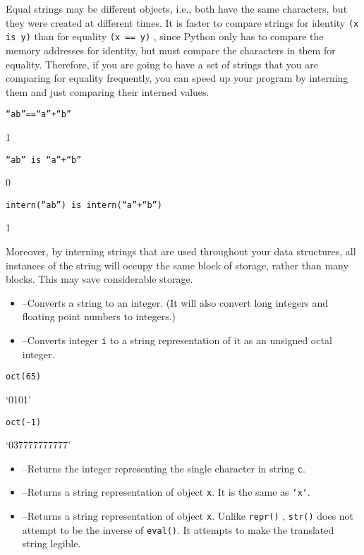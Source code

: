 Equal strings may be different
objects, i.e., both have the same characters, but they were created at
different times. It is faster to compare strings for identity \texttt{(x
is y)} than for equality \texttt{(x == y)} , since Python only has to
compare the memory addresses for identity, but must compare the
characters in them for equality. Therefore, if you are going to have a
set of strings that you are comparing for equality frequently, you can
speed up your program by interning them and just comparing their
interned values.


\texttt{``ab''==``a''+``b''}

1


\texttt{``ab'' is ``a''+``b''}

0


\texttt{intern(``ab'') is intern(``a''+``b'')}

1

Moreover, by interning strings that
are used throughout your data structures, all instances of the string
will occupy the same block of storage, rather than many blocks. This may
save considerable storage.

\begin{itemize}

\item
   --Converts a
  string to an integer. (It will also convert long integers and floating
  point numbers to integers.)
\item
   --Converts integer
  \texttt{i} to a string representation of it as an unsigned octal
  integer.
\end{itemize}


\texttt{oct(65)}

`0101'


\texttt{oct(-1)}

`037777777777'

\begin{itemize}

\item
   --Returns the
  integer representing the single character in string \texttt{c}.
\item
   --Returns a
  string representation of object \texttt{x}. It is the same as
  \texttt{`x`}.
\item
   --Returns a string
  representation of object \texttt{x}. Unlike \texttt{repr()} ,
  \texttt{str()} does not attempt to be the inverse of \texttt{eval()}. It
  attempts to make the translated string legible.
\end{itemize}

